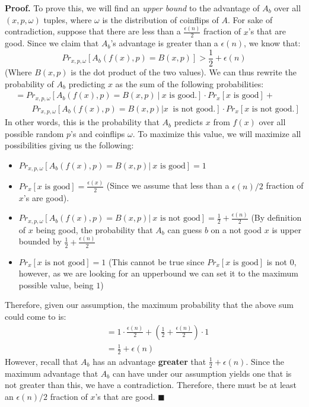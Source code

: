 \documentclass[11pt]{article}
\begin{document}
\textbf{Proof.} To prove this, we will find an \textit{upper bound} to the advantage of $A_b$ over all $(x,p,\omega)$ tuples, where $\omega$ is the distribution of coinflips of $A$. For sake of contradiction, suppose that there are less than a $\frac{\epsilon(n)}{2}$ fraction of $x$'s that are good. Since we claim that $A_b$'s advantage is greater than a $\epsilon(n)$, we know that:
$$Pr_{x,p,\omega}[A_b(f(x),p) = B(x,p)] > \frac{1}{2} + \epsilon(n)$$ (Where $B(x,p)$ is the dot product of the two values). We can thus rewrite the probability of $A_b$ predicting $x$ as the sum of the following probabilities:
\begin{align*}
&= Pr_{x,p,\omega}[A_b(f(x),p) = B(x,p)\ \vert \ x \text{ is good.}] \cdot Pr_x[x \text{ is good}] +\\ 
&\quad \quad Pr_{x,p,\omega}[A_b(f(x),p) = B(x,p) \vert x\ \text{ is not good.}] \cdot Pr_x[x\text{ is not good.}]
\end{align*}
In other words, this is the probability that $A_b$ predicts $x$ from $f(x)$ over all possible random $p$'s and coinflips $\omega$. To maximize this value, we will maximize all possibilities giving us the following:
\begin{itemize}
    \item $Pr_{x,p,\omega}[A_b(f(x),p) = B(x,p) \vert \ x \text{ is good} ] = 1$
    \item $Pr_x[x\text{ is good}] = \frac{\epsilon(x)}{2}$ (Since we assume that less than a $\epsilon(n)/2$ fraction of $x$'s are good).
    \item $Pr_{x,p,\omega}[A_b(f(x),p) = B(x,p) |\  x \text{ is not good}] = \frac{1}{2} + \frac{\epsilon(n)}{2}$ (By definition of $x$ being good, the probability that $A_b$ can guess $b$ on a not good $x$ is upper bounded by $\frac{1}{2} + \frac{\epsilon(n)}{2}$
    \item $Pr_x[x \text{ is not good}] = 1$ (This cannot be true since $Pr_x[x \text{ is good}]$ is not $0$, however, as we are looking for an upperbound we can set it to the maximum possible value, being $1$)
\end{itemize}
Therefore, given our assumption, the maximum probability that the above sum could come to is:
\begin{align*}
&= 1 \cdot \frac{\epsilon(n)}{2} + (\frac{1}{2}+\frac{\epsilon(n)}{2}) \cdot 1\\
&= \frac{1}{2} + \epsilon(n)
\end{align*}
However, recall that $A_b$ has an advantage \textbf{greater} that $\frac{1}{2} + \epsilon(n)$. Since the maximum advantage that $A_b$ can have under our assumption yields one that is not greater than this, we have a contradiction. Therefore, there must be at least an $\epsilon(n)/2$ fraction of $x$'s that are good. $\blacksquare$
\end{document}
